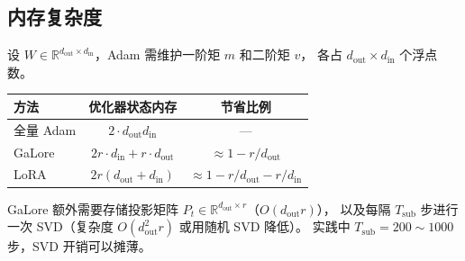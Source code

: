 \documentclass[12pt, a4paper]{article}
\begin{document}
\subsection{内存复杂度}

设 $W \in \mathbb{R}^{d_{\mathrm{out}} \times d_{\mathrm{in}}}$，Adam 需维护一阶矩 $m$ 和二阶矩 $v$，
各占 $d_{\mathrm{out}} \times d_{\mathrm{in}}$ 个浮点数。

\begin{center}
\begin{tabular}{lcc}
\toprule
方法 & 优化器状态内存 & 节省比例 \\
\midrule
全量 Adam & $2 \cdot d_{\mathrm{out}} d_{\mathrm{in}}$ & — \\
GaLore    & $2r \cdot d_{\mathrm{in}} + r \cdot d_{\mathrm{out}}$ & $\approx 1 - r/d_{\mathrm{out}}$ \\
LoRA      & $2r(d_{\mathrm{out}} + d_{\mathrm{in}})$ & $\approx 1 - r/d_{\mathrm{out}} - r/d_{\mathrm{in}}$ \\
\bottomrule
\end{tabular}
\end{center}

GaLore 额外需要存储投影矩阵 $P_t \in \mathbb{R}^{d_{\mathrm{out}}\times r}$（$O(d_{\mathrm{out}} r)$），
以及每隔 $T_{\mathrm{sub}}$ 步进行一次 SVD（复杂度 $O(d_{\mathrm{out}}^2 r)$ 或用随机 SVD 降低）。
实践中 $T_{\mathrm{sub}} = 200 \sim 1000$ 步，SVD 开销可以摊薄。
\end{document}
